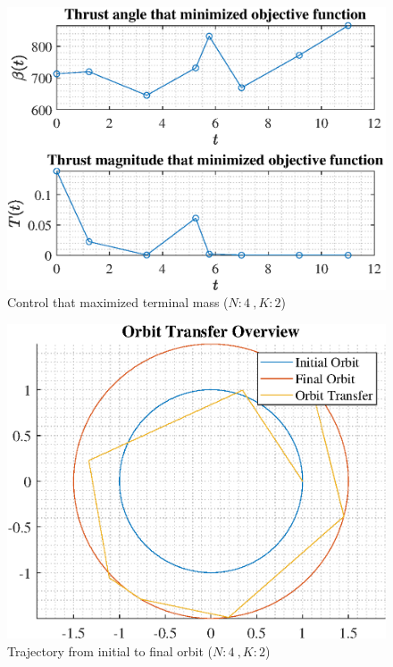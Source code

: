 \documentclass[]{article}
\begin{document}
\begin{figure}
	\centering
	\includegraphics[scale=0.75]{control_N4_K2_C2_mf.eps}
	\caption{Control that maximized terminal mass (\(N:4\ , K:2\))}
	\label{fig:control_N4_K2_C2_mf}
\end{figure}
\begin{figure}
	\centering
	\includegraphics[scale=0.75]{orbit_N4_K2_C2_mf.eps}
	\caption{Trajectory from initial to final orbit (\(N:4\ , K:2\))}
	\label{fig:orbit_N4_K2_C2_mf}
\end{figure}
\end{document}
